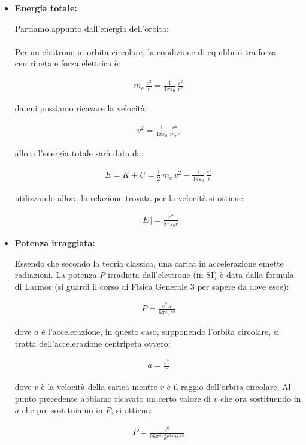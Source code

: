\begin{itemize} 
	\item \textbf{Energia totale:}
		
		Partiamo appunto dall'energia dell'orbita:
\\
\\
	 Per un elettrone in orbita circolare, la condizione di equilibrio tra forza centripeta e forza elettrica è:
	
\begin{align*}
	m_e \, \frac{v^2}{r} = \frac{1}{4\pi\varepsilon_0} \, \frac{e^2}{r^2}
\end{align*}

	da cui possiamo ricavare la velocità:
	
\begin{align*}
	v^2 = \frac{1}{4\pi\varepsilon_0} \, \frac{e^2}{m_e r}
\end{align*}

	allora l'energia totale sarà data da:
	
\begin{align*}
	E = K + U = \frac{1}{2} \, m_e \, v^2 - \frac{1}{4\pi\varepsilon_0} \, \frac{e^2}{r}
\end{align*}

	utilizzando allora la relazione trovata per la velocità si ottiene:
	
\begin{align*}
	|\, E \, | = \frac{e^2}{8\pi\varepsilon_0 r}
\end{align*}

	\item \textbf{Potenza irraggiata:}

	Essendo che secondo la teoria classica, una carica in accelerazione emette radiazioni. La potenza $P$ irradiata dall'elettrone (in SI) è data dalla formula di Larmor (si guardi il corso di Fisica Generale 3 per sapere da dove esce):
	
\begin{align*}
	P = \frac{e^2 \, a}{6\pi\varepsilon_0 c^3}
\end{align*}

	dove $a$ è l'accelerazione, in questo caso, supponendo l'orbita circolare, si tratta dell'accelerazione centripeta ovvero:
	
\begin{align*}
	a = \frac{v^2}{r}
\end{align*}

	dove $v$ è la velocità della carica mentre $r$ è il raggio dell'orbita circolare. Al punto precedente abbiamo ricavato un certo valore di $v$ che ora sostituendo in $a$ che poi sostituiamo in $P$, si ottiene:

\begin{align*}
	P = \frac{e^6}{96\pi^3\varepsilon_0^3 c^3 m_e^2 r^4}
\end{align*}

\end{itemize}

